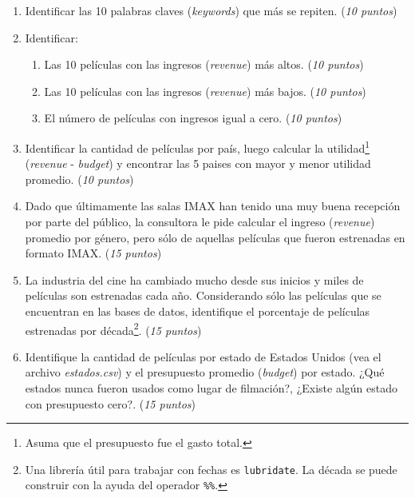 \documentclass[11pt,]{article}
\providecommand{\tightlist}{%
  \setlength{\itemsep}{0pt}\setlength{\parskip}{0pt}}
\let\rmarkdownfootnote\footnote%
\def\footnote{\protect\rmarkdownfootnote}
\begin{document}
\begin{enumerate}
\def\labelenumi{\arabic{enumi}.}
\item
  Identificar las 10 palabras claves (\emph{keywords}) que más se
  repiten. (\emph{10 puntos})
\item
  Identificar:

  \begin{enumerate}
  \def\labelenumii{\alph{enumii}.}
  \tightlist
  \item
    Las 10 películas con las ingresos (\emph{revenue}) más altos.
    (\emph{10 puntos})
  \item
    Las 10 películas con las ingresos (\emph{revenue}) más bajos.
    (\emph{10 puntos})
  \item
    El número de películas con ingresos igual a cero. (\emph{10 puntos})
  \end{enumerate}
\item
  Identificar la cantidad de películas por país, luego calcular la
  utilidad\footnote{Asuma que el presupuesto fue el gasto total.}
  (\emph{revenue} - \emph{budget}) y encontrar las 5 paises con mayor y
  menor utilidad promedio. (\emph{10 puntos})
\item
  Dado que últimamente las salas IMAX han tenido una muy buena recepción
  por parte del público, la consultora le pide calcular el ingreso
  (\emph{revenue}) promedio por género, pero sólo de aquellas películas
  que fueron estrenadas en formato IMAX. (\emph{15 puntos})
\item
  La industria del cine ha cambiado mucho desde sus inicios y miles de
  películas son estrenadas cada año. Considerando sólo las películas que
  se encuentran en las bases de datos, identifique el porcentaje de
  películas estrenadas por década\footnote{Una librería útil para
    trabajar con fechas es \texttt{lubridate}. La década se puede
    construir con la ayuda del operador \texttt{\%\%}.}. (\emph{15
  puntos})
\item
  Identifique la cantidad de películas por estado de Estados Unidos (vea
  el archivo \emph{estados.csv}) y el presupuesto promedio
  (\emph{budget}) por estado. ¿Qué estados nunca fueron usados como
  lugar de filmación?, ¿Existe algún estado con presupuesto cero?.
  (\emph{15 puntos})
\end{enumerate}
\end{document}

